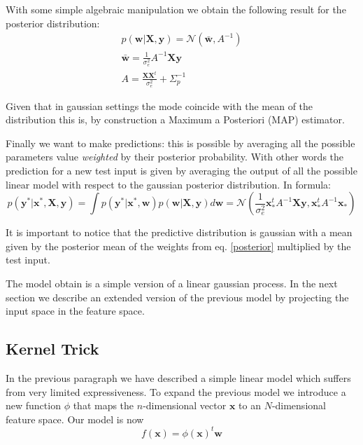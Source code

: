       \noindent With some simple algebraic manipulation we obtain the following result for the posterior distribution:
      \begin{equation}
        \begin{split}
          p(\pmb{w}|\pmb{X},\pmb{y}) = \mathcal{N}(\bar{\pmb{w}}, A^{-1}) \\
          \bar{\pmb{w}} = \frac{1}{\sigma^{2}_{e}} A^{-1} \pmb{X} \pmb{y} \\
          A = \frac{\pmb{X}\pmb{X}^t}{\sigma^{2}_e} + \Sigma_{p}^{-1}
        \end{split}
        \label{posterior}
      \end{equation}

      \noindent Given that in gaussian settings the mode coincide with the mean of the distribution this is, by construction a
      Maximum a Posteriori (MAP) estimator.\newline

      \noindent Finally we want to make predictions: this is possible by averaging all the possible parameters value \textit{weighted}
      by their posterior probability. With other words the prediction for a new test input is given by averaging
      the output of all the possible linear model with respect to the gaussian posterior distribution. In formula:
      \begin{equation*}
        p(\pmb{y}^{*}|\pmb{x}^{*}, \pmb{X}, \pmb{y}) = \int p(\pmb{y}^{*}|\pmb{x}^{*}, \pmb{w}) p(\pmb{w}|\pmb{X},\pmb{y}) d\pmb{w} = \mathcal{N}(\frac{1}{\sigma^{2}_{e}} \pmb{x}_{*}^{t} A^{-1} \pmb{X} \pmb{y}, \pmb{x}_{*}^{t} A^{-1} \pmb{x}_{*})
      \end{equation*}

      \noindent It is important to notice that the predictive distribution is gaussian with a mean given by the posterior mean of
      the weights from eq. \ref{posterior} multiplied by the test input.\newline

      \noindent The model obtain is a simple version of a linear gaussian process. In the next section we describe an extended version
      of the previous model by projecting the input space in the feature space.

    \subsection{Kernel Trick}
      \noindent In the previous paragraph we have described a simple linear model which suffers from very limited expressiveness.
      To expand the previous model we introduce a new function $\phi$ that maps the $n$-dimensional vector $\pmb{x}$ to
      an $N$-dimensional feature space.\newline
      Our model is now
      \begin{equation}
        f(\pmb{x}) = \phi(\pmb{x})^t \pmb{w}
      \end{equation}

